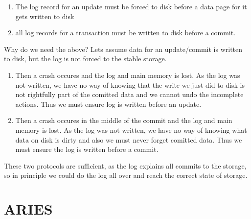 \documentclass[a4paper, 11pt]{article}
\begin{document}
\begin{enumerate}
    \item The log record for an update must be forced to disk before a data page for it gets written to disk 
    \item all log records for a transaction must be written to disk before a commit.
\end{enumerate}
Why do we need the above?
Lets assume data for an update/commit is written to disk, but the log is not forced to the stable storage.
\begin{enumerate}
    \item Then a crash occures and the log and main memory is lost. As the log was not written, we have no way of knowing that the write we just did to disk is not rightfully part of the comitted data and we cannot undo the incomplete actions. Thus we must ensure log is written before an update.
    \item  Then a crash occures in the middle of the commit and the log and main memory is lost. As the log was not written, we have no way of knowing what data on disk is dirty and also we must never forget comitted data. Thus we must ensure the log is written before a commit.
\end{enumerate}
These two protocols are sufficient, as the log explains all commits to the storage, so in principle we could do the log all over and reach the correct state of storage.



\section{ARIES} %
\label{sec:aries}

\begin{table}[H]
    \begin{minipage}{0.5\textwidth}
        
    \end{minipage}
    \begin{minipage}{0.5\textwidth}
        
    \end{minipage}
\end{table}
\end{document}
